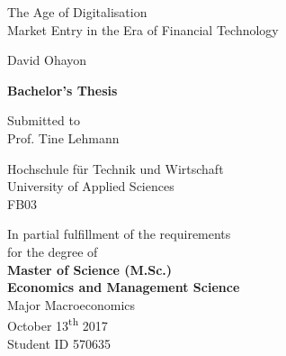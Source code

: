 \documentclass[11pt,a4paper]{article}
\begin{document}
  
  
 
 
\begin{titlepage}    
\begin{center} 

\vspace*{2cm}

{\Huge{The Age of Digitalisation}} \\
\vspace*{0.4cm} 
\LARGE{Market Entry in the Era of Financial Technology}

\vspace*{1.5cm} 

\Large{David Ohayon}\\


\vspace*{1.5cm}

\large{
\textbf{Bachelor's Thesis}\\
} 
      
\vspace*{1cm}

\large{Submitted to\\
Prof. Tine Lehmann\\}

\vspace*{1.0cm}
\large{Hochschule für Technik und Wirtschaft\\}
\large{University of Applied Sciences\\}
\large{FB03}
\vspace*{1.0cm}

\vspace*{2cm}
\small{In partial fulfillment of the requirements\\
for the degree of \\
\vspace{4mm}
\normalsize \textbf{Master of Science (M.Sc.) \\
Economics and Management Science}\\
\vspace{2mm}
Major Macroeconomics}\\
\vspace{1cm}
\large{October 13\textsuperscript{th} 2017}\\
\large{Student ID 570635}\\
      
\end{center}
\end{titlepage}
\end{document}
